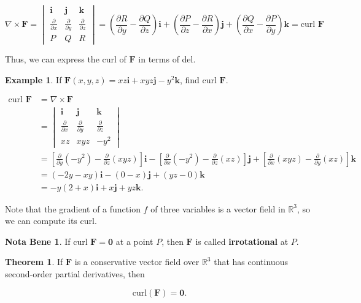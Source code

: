 \documentclass[11pt,oneside,english]{amsart}
\theoremstyle{definition}
\newtheorem{theorem}{Theorem}
\newtheorem*{example}{Example}
\newtheorem*{note}{Nota Bene}
\newcommand{\R}{\mathbb{R}}
\newcommand{\pp}[2]{\frac{\partial{#1}}{\partial{#2}}}
\begin{document}
\[
\nabla\times\mathbf{F}=\begin{vmatrix}\mathbf{i} & \mathbf{j} & \mathbf{k}\\\pp{}{x} & \pp{}{y} & \pp{}{z}\\ P & Q & R\end{vmatrix}=\left(\pp{R}{y}-\pp{Q}{z}\right)\mathbf{i}+\left(\pp{P}{z}-\pp{R}{x}\right)\mathbf{j}+\left(\pp{Q}{x}-\pp{P}{y}\right)\mathbf{k}=\text{curl }\mathbf{F}
\]

Thus, we can express the curl of $\mathbf{F}$ in terms of del.


\begin{example}
If $\mathbf{F}(x,y,z)=xz\mathbf{i}+xyz\mathbf{j}-y^2\mathbf{k}$, find curl $\mathbf{F}$.

\begin{align*}
\text{curl }\mathbf{F}&=\nabla \times \mathbf{F}\\[2mm]
&=\begin{vmatrix}\mathbf{i} & \mathbf{j} & \mathbf{k}\\\pp{}{x} & \pp{}{y} & \pp{}{z}\\ xz & xyz & -y^2\end{vmatrix}\\[2mm]
&=\left[\pp{}{y}(-y^2)-\pp{}{z}(xyz)\right]\mathbf{i}-\left[\pp{}{x}(-y^2)-\pp{}{z}(xz)\right]\mathbf{j}+\left[\pp{}{x}(xyz)-\pp{}{y}(xz)\right]\mathbf{k}\\[2mm]
&=(-2y-xy)\mathbf{i}-(0-x)\mathbf{j}+(yz-0)\mathbf{k}\\[2mm]
&=-y(2+x)\mathbf{i}+x\mathbf{j}+yz\mathbf{k}.
\end{align*}
\end{example}

Note that the gradient of a function $f$ of three variables is a vector field in $\R^3$, so we can compute its curl.

\begin{note}
If curl $\mathbf{F}=\mathbf{0}$ at a point $P$, then $\mathbf{F}$ is called \textbf{irrotational} at $P$.
\end{note}

\begin{theorem}
If $\mathbf{F}$ is a conservative vector field over $\R^3$ that has continuous second-order partial derivatives, then

\[
\text{curl}(\mathbf{F})=\mathbf{0}.
\]
\end{theorem}
\end{document}

